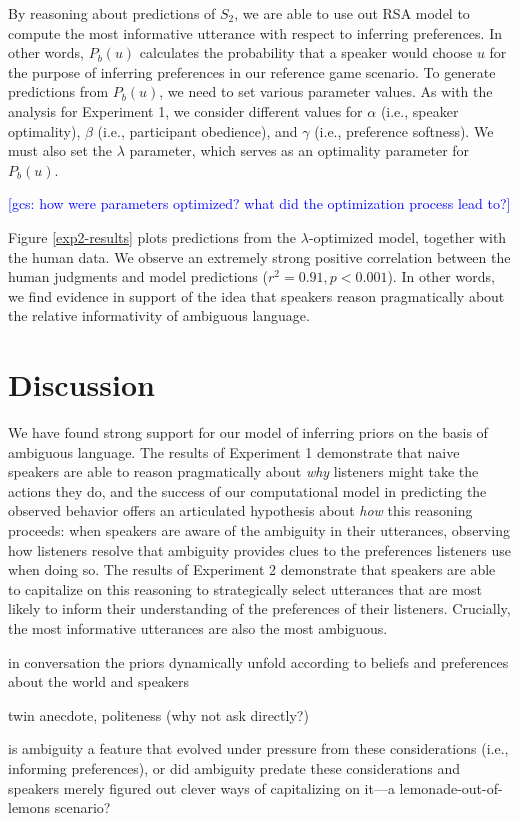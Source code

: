 \documentclass[10pt,a4paper]{article}
\newcommand{\gcs}[1]{\textcolor{blue}{[gcs: #1]}}
\begin{document}
By reasoning about predictions of $S_2$, we are able to use out RSA model to compute the most informative utterance with respect to inferring preferences. In other words, $P_b(u)$ calculates the probability that a speaker would choose $u$ for the purpose of inferring preferences in our reference game scenario. To generate predictions from $P_b(u)$, we need to set various parameter values. As with the analysis for Experiment 1, we consider different values for $\alpha$ (i.e., speaker optimality), $\beta$ (i.e., participant obedience), and $\gamma$ (i.e., preference softness). We must also set the $\lambda$ parameter, which serves as an optimality parameter for $P_b(u)$.   

\gcs{how were parameters optimized? what did the optimization process lead to?}

Figure \ref{exp2-results} plots predictions from the $\lambda$-optimized model, together with the human data. We observe an extremely strong positive correlation between the human judgments and model predictions ($r^2 = 0.91, p < 0.001$). In other words, we find evidence in support of the idea that speakers reason pragmatically about the relative informativity of ambiguous language.

\section{Discussion}

We have found strong support for our model of inferring priors on the basis of ambiguous language. The results of Experiment 1 demonstrate that naive speakers are able to reason pragmatically about \emph{why} listeners might take the actions they do, and the success of our computational model in predicting the observed behavior offers an articulated hypothesis about \emph{how} this reasoning proceeds: when speakers are aware of the ambiguity in their utterances, observing how listeners resolve that ambiguity provides clues to the preferences listeners use when doing so. The results of Experiment 2 demonstrate that speakers are able to capitalize on this reasoning to strategically select utterances that are most likely to inform their understanding of the preferences of their listeners. Crucially, the most informative utterances are also the most ambiguous.


in conversation the priors dynamically unfold according to beliefs and preferences about the world and speakers

twin anecdote, politeness (why not ask directly?)

is ambiguity a feature that evolved under pressure from these considerations (i.e., informing preferences), or did ambiguity predate these considerations and speakers merely figured out clever ways of capitalizing on it---a lemonade-out-of-lemons scenario?


\setlength{\bibleftmargin}{.125in}
\setlength{\bibindent}{-\bibleftmargin}


\end{document}
